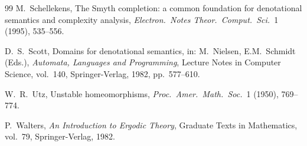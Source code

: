 \documentclass[11pt,a4paper]{article}
\theoremstyle{plain}
\theoremstyle{definition}
\begin{document}
\begin{thebibliography}{99}
 M.~Schellekens, The Smyth completion: a
  common foundation for denotational semantics and complexity
  analysis, \textit{Electron.\ Notes Theor.\ Comput.\ Sci.}\ 1
  (1995), 535--556.

 D.~S.~Scott, Domains for denotational semantics,
  in: M.~Nielsen, E.M.~Schmidt (Eds.), \textit{Automata, Languages
  and Programming}, Lecture Notes in Computer Science, vol.~140,
  Springer-Verlag, 1982, pp.~577--610.

 W.~R.~Utz, Unstable homeomorphisms, \textit{Proc.\
  Amer.\ Math.\ Soc.}\ 1 (1950), 769--774.

 P.~Walters, \textit{An Introduction to Ergodic
  Theory}, Graduate Texts in Mathematics, vol.~79, Springer-Verlag,
  1982.

\end{thebibliography}
\end{document}
